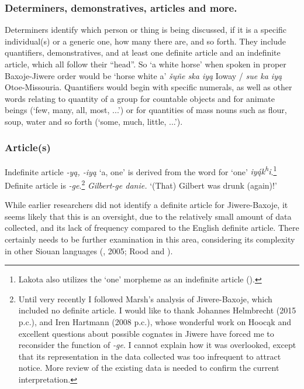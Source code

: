 \documentclass[output=paper]{LSP/langsci}
\begin{document}
\subsubsection{Determiners, demonstratives, articles and more.}  Determiners identify which person or thing is being discussed, if it is a specific individual(s) or a generic one, how many there are, and so forth.  They include quantifiers, demonstratives, and at least one definite article and an indefinite article, which all follow their ``head''.  So `a white horse' when spoken in proper Baxoje-Jiwere order would be `horse white a' \textit{\v{s}\k{u}\~ne ska iy\k{a}} Ioway / \textit{sue ka iy\k{a}} Otoe-Missouria.  Quantifiers would begin with specific numerals, as well as other words relating to quantity of a group for countable objects and for animate beings (`few, many, all, most, ...') or for quantities of mass nouns such as flour, soup, water and so forth (`some, much, little, ...').   

\subsubsection{Article(s)}  

Indefinite article \textit{-y\k{a}, -iy\k{a}} `a, one' is derived from the word for `one' \textit{iy\k{á}k\textsuperscript{h}i}.\footnote{Lakota also utilizes the `one' morpheme as an indefinite article (\citealt[755-756]{Ullrich2008}).} Definite article is \textit{-ge}.\footnote{Until very recently I followed Marsh's analysis of Jiwere-Baxoje, which included no definite article. I would like to thank Johannes Helmbrecht (2015 p.c.), and Iren Hartmann (2008 p.c.), whose wonderful work on Hooc\k{a}k and excellent questions about possible cognates in Jiwere have forced me to reconsider the function of \textit{-ge}. I cannot explain how it was overlooked, except that its representation in the data collected was too infrequent to attract notice. More review of the existing data is needed to confirm the current interpretation.}   \textit{Gilbert-ge danie.}  `(That) Gilbert was drunk (again)!'

While earlier researchers did not identify a definite article for Jiwere-Baxoje, it seems likely that this is an oversight, due to the relatively small amount of data collected, and its lack of frequency compared to the English definite article. There certainly needs to be further examination in this area, considering its complexity in other Siouan languages (\citealt{Rankin1977}, 2005; Rood and \citealt[455]{Taylor1996}).  
\end{document}
